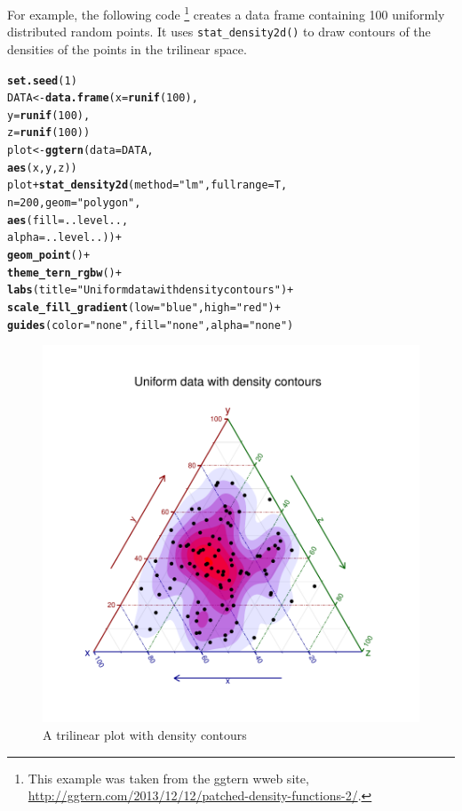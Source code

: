 \documentclass[11pt]{book}\usepackage[]{graphicx}\usepackage[]{color}
\makeatletter
\newcommand{\hlnum}[1]{\textcolor[rgb]{0.686,0.059,0.569}{#1}}%
\newcommand{\hlstr}[1]{\textcolor[rgb]{0.192,0.494,0.8}{#1}}%
\newcommand{\hlopt}[1]{\textcolor[rgb]{0,0,0}{#1}}%
\newcommand{\hlstd}[1]{\textcolor[rgb]{0.345,0.345,0.345}{#1}}%
\newcommand{\hlkwb}[1]{\textcolor[rgb]{0.69,0.353,0.396}{#1}}%
\newcommand{\hlkwc}[1]{\textcolor[rgb]{0.333,0.667,0.333}{#1}}%
\newcommand{\hlkwd}[1]{\textcolor[rgb]{0.737,0.353,0.396}{\textbf{#1}}}%
\newenvironment{kframe}{%
 \def\at@end@of@kframe{}%
 \ifinner\ifhmode%
  \def\at@end@of@kframe{\end{minipage}}%
  \begin{minipage}{\columnwidth}%
 \fi\fi%
 \def\FrameCommand##1{\hskip\@totalleftmargin \hskip-\fboxsep
 \colorbox{shadecolor}{##1}\hskip-\fboxsep
     \hskip-\linewidth \hskip-\@totalleftmargin \hskip\columnwidth}%
 \MakeFramed {\advance\hsize-\width
   \@totalleftmargin\z@ \linewidth\hsize
   \@setminipage}}%
 {\par\unskip\endMakeFramed%
 \at@end@of@kframe}
\newenvironment{knitrout}{}{} %
\renewenvironment{knitrout}{\small\renewcommand{\baselinestretch}{.85}}{} %
\makeatother
\begin{document}
For example, the following code%
\footnote{
This example was taken from the ggtern wweb site,
\url{http://ggtern.com/2013/12/12/patched-density-functions-2/}.
}
creates a data frame
 containing 100 uniformly distributed
random points.  It uses \verb|stat_density2d()|
to draw contours of the densities of the points in the
trilinear space.
\begin{knitrout}
\color{fgcolor}\begin{kframe}
\begin{alltt}
\hlkwd{set.seed}\hlstd{(}\hlnum{1}\hlstd{)}
\hlstd{DATA} \hlkwb{<-} \hlkwd{data.frame}\hlstd{(}\hlkwc{x} \hlstd{=} \hlkwd{runif}\hlstd{(}\hlnum{100}\hlstd{),}
                   \hlkwc{y} \hlstd{=} \hlkwd{runif}\hlstd{(}\hlnum{100}\hlstd{),}
                   \hlkwc{z} \hlstd{=} \hlkwd{runif}\hlstd{(}\hlnum{100}\hlstd{))}
\hlstd{plot} \hlkwb{<-} \hlkwd{ggtern}\hlstd{(}\hlkwc{data} \hlstd{= DATA,}
               \hlkwd{aes}\hlstd{(x, y, z))}
\hlstd{plot} \hlopt{+} \hlkwd{stat_density2d}\hlstd{(}\hlkwc{method} \hlstd{=} \hlstr{"lm"}\hlstd{,} \hlkwc{fullrange} \hlstd{= T,}
                      \hlkwc{n} \hlstd{=} \hlnum{200}\hlstd{,} \hlkwc{geom} \hlstd{=} \hlstr{"polygon"}\hlstd{,}
                      \hlkwd{aes}\hlstd{(}\hlkwc{fill} \hlstd{= ..level..,}
                          \hlkwc{alpha} \hlstd{= ..level..))} \hlopt{+}
    \hlkwd{geom_point}\hlstd{()} \hlopt{+}
    \hlkwd{theme_tern_rgbw}\hlstd{()} \hlopt{+}
    \hlkwd{labs}\hlstd{(}\hlkwc{title} \hlstd{=} \hlstr{"Uniform data with density contours"}\hlstd{)}    \hlopt{+}
    \hlkwd{scale_fill_gradient}\hlstd{(}\hlkwc{low} \hlstd{=} \hlstr{"blue"}\hlstd{,}\hlkwc{high} \hlstd{=} \hlstr{"red"}\hlstd{)}  \hlopt{+}
    \hlkwd{guides}\hlstd{(}\hlkwc{color} \hlstd{=} \hlstr{"none"}\hlstd{,} \hlkwc{fill} \hlstd{=} \hlstr{"none"}\hlstd{,} \hlkwc{alpha} \hlstd{=} \hlstr{"none"}\hlstd{)}
\end{alltt}
\end{kframe}\begin{figure}[htbp]


\centerline{\includegraphics[width=.6\textwidth,trim=20 20 20 20,clip]{ch04/fig/ggterm-demo} }

\caption[A trilinear plot with density contours]{A trilinear plot with density contours\label{fig:ggterm-demo}}
\end{figure}


\end{knitrout}
\end{document}
